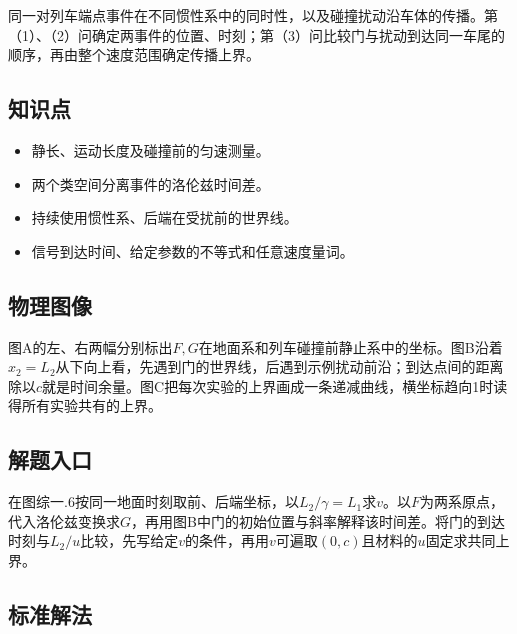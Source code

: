 \documentclass[UTF8,fontset=fandol,a4paper,11pt]{ctexart}
\begin{document}
同一对列车端点事件在不同惯性系中的同时性，以及碰撞扰动沿车体的传播。第（1）、（2）问确定两事件的位置、时刻；第（3）问比较门与扰动到达同一车尾的顺序，再由整个速度范围确定传播上界。



\subsection*{知识点}

\begin{itemize}
\item 静长、运动长度及碰撞前的匀速测量。
\item 两个类空间分离事件的洛伦兹时间差。
\item 持续使用惯性系、后端在受扰前的世界线。
\item 信号到达时间、给定参数的不等式和任意速度量词。
\end{itemize}



\subsection*{物理图像}

图A的左、右两幅分别标出$F,G$在地面系和列车碰撞前静止系中的坐标。图B沿着$x_2=L_2$从下向上看，先遇到门的世界线，后遇到示例扰动前沿；到达点间的距离除以$c$就是时间余量。图C把每次实验的上界画成一条递减曲线，横坐标趋向1时读得所有实验共有的上界。



\subsection*{解题入口}

在图综一.6按同一地面时刻取前、后端坐标，以$L_2/\gamma=L_1$求$v$。以$F$为两系原点，代入洛伦兹变换求$G$，再用图B中门的初始位置与斜率解释该时间差。将门的到达时刻与$L_2/u$比较，先写给定$v$的条件，再用$v$可遍取$(0,c)$且材料的$u$固定求共同上界。



\subsection*{标准解法}
\end{document}
